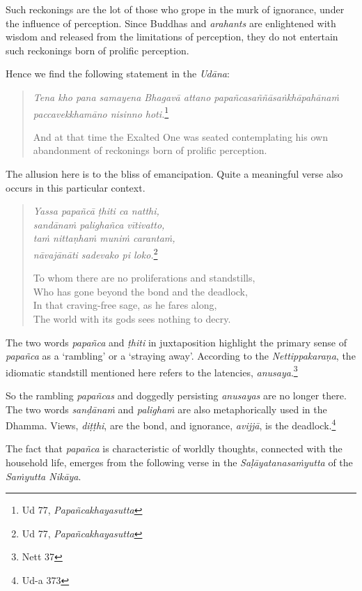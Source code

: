 Such reckonings are the lot of those who grope in the murk of ignorance, under the influence of perception. Since Buddhas and \emph{arahants} are enlightened with wisdom and released from the limitations of perception, they do not entertain such reckonings born of prolific perception.

\clearpage

Hence we find the following statement in the \emph{Udāna}:

\begin{quote}
\emph{Tena kho pana samayena Bhagavā attano papañcasaññāsaṅkhāpahānaṁ paccavekkhamāno nisinno hoti.}\footnote{Ud 77, \emph{Papañcakhayasutta}}

And at that time the Exalted One was seated contemplating his own abandonment of reckonings born of prolific perception.
\end{quote}

The allusion here is to the bliss of emancipation. Quite a meaningful verse also occurs in this particular context.

\begin{quote}
\emph{Yassa papañcā ṭhiti ca natthi,}\\
\emph{sandānaṁ palighañca vītivatto,}\\
\emph{taṁ nittaṇhaṁ muniṁ carantaṁ,}\\
\emph{nāvajānāti sadevako pi loko.}\footnote{Ud 77, \emph{Papañcakhayasutta}}

To whom there are no proliferations and standstills,\\
Who has gone beyond the bond and the deadlock,\\
In that craving-free sage, as he fares along,\\
The world with its gods sees nothing to decry.
\end{quote}

The two words \emph{papañca} and \emph{ṭhiti} in juxtaposition highlight the primary sense of \emph{papañca} as a `rambling' or a `straying away'. According to the \emph{Nettippakaraṇa}, the idiomatic standstill mentioned here refers to the latencies, \emph{anusaya}.\footnote{Nett 37}

So the rambling \emph{papañcas} and doggedly persisting \emph{anusayas} are no longer there. The two words \emph{sanḍānaṁ} and \emph{palighaṁ} are also metaphorically used in the Dhamma. Views, \emph{diṭṭhi}, are the bond, and ignorance, \emph{avijjā}, is the deadlock.\footnote{Ud-a 373}

The fact that \emph{papañca} is characteristic of worldly thoughts, connected with the household life, emerges from the following verse in the \emph{Saḷāyatanasaṁyutta} of the \emph{Saṁyutta Nikāya}.

